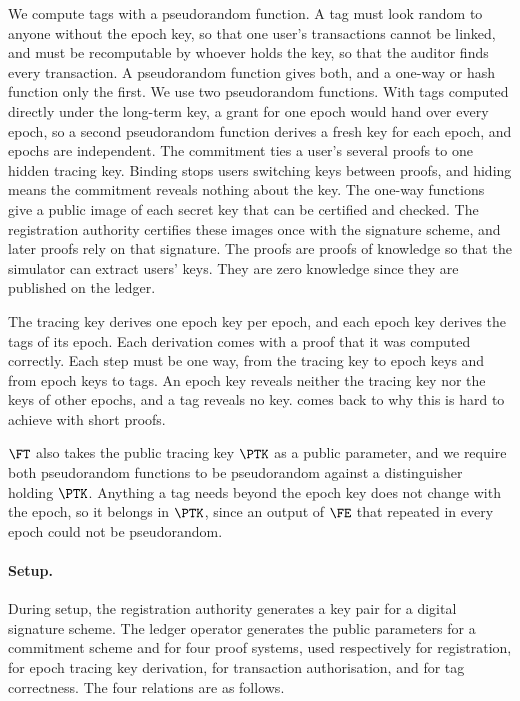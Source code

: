 We compute tags with a pseudorandom function. A tag must look random to anyone
without the epoch key, so that one user's transactions cannot be linked, and
must be recomputable by whoever holds the key, so that the auditor finds every
transaction. A pseudorandom function gives both, and a one-way or hash function
only the first. We use two pseudorandom functions. With tags computed directly
under the long-term key, a grant for one epoch would hand over every epoch, so a second pseudorandom function derives a fresh key for each
epoch, and epochs are independent. The commitment ties a user's several proofs
to one hidden tracing key. Binding stops users switching keys between proofs,
and hiding means the commitment reveals nothing about the key. The one-way
functions give a public image of each secret key that can be certified and
checked. The registration authority certifies these images once with the
signature scheme, and later proofs rely on that signature. The proofs are proofs of knowledge so that the simulator can extract users'
keys. They are zero knowledge since they are published on the ledger.

The tracing key derives one epoch key per epoch, and each epoch key derives the
tags of its epoch. Each derivation comes with a proof that it was computed
correctly. Each step must be one way, from the tracing key to epoch keys and from epoch
keys to tags. An epoch key
reveals neither the tracing key nor the keys of other epochs, and a tag reveals
no key.  comes back to why this is hard to achieve
with short proofs.

$\FT$ also takes the public tracing key $\PTK$ as a public parameter, and we
require both pseudorandom functions to be pseudorandom against a distinguisher
holding $\PTK$. Anything a tag needs beyond the epoch key does not change with
the epoch, so it belongs in $\PTK$, since an output of $\FE$ that repeated in
every epoch could not be pseudorandom.

\paragraph{Setup.} During setup, the registration authority generates a key pair
for a digital signature scheme. The ledger operator generates the public parameters for a commitment
scheme and for four proof systems, used respectively for registration, for epoch
tracing key derivation, for transaction authorisation, and for tag correctness.
The four relations are as follows.

